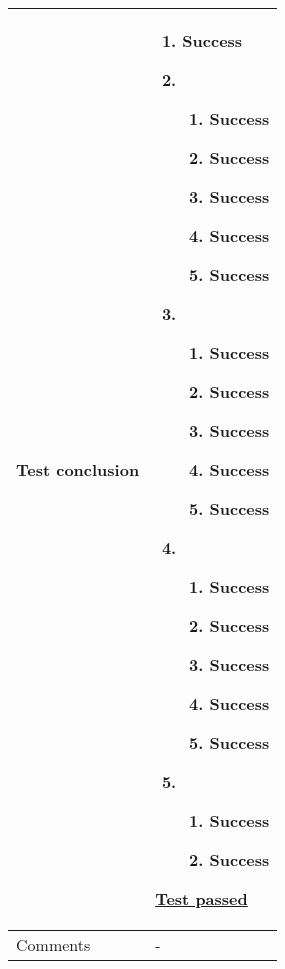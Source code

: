 \begin{center}
\begin{longtable}{ | p{4cm} | p{10cm} | }
			Test conclusion & 	\begin{enumerate}
							\item Success

							\item  
							\begin{enumerate}
								\item Success
								\item Success
								\item Success
								\item Success
								\item Success
							\end{enumerate}
							
							\item
							\begin{enumerate}
								\item Success
								\item Success
								\item Success
								\item Success
								\item Success
							\end{enumerate}

							\item 
							\begin{enumerate}																							
								\item Success
								\item Success
								\item Success
								\item Success
								\item Success
							\end{enumerate}

							\item 
							\begin{enumerate}																							
								\item Success
								\item Success
							\end{enumerate}
						\end{enumerate}

						\underline{Test passed} \\ [3pt] \hline
			Comments &	- \\ [3pt] \hline
		\end{longtable}
	\end{center}

